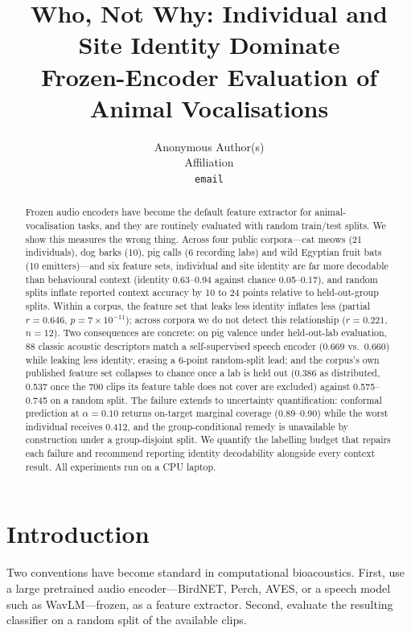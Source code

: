 \documentclass{article}
\title{Who, Not Why: Individual and Site Identity Dominate\\Frozen-Encoder Evaluation of Animal Vocalisations}
\author{%
  Anonymous Author(s)\\
  Affiliation\\
  \texttt{email}
}
\begin{document}
\maketitle

\begin{abstract}
Frozen audio encoders have become the default feature extractor for animal-vocalisation tasks, and
they are routinely evaluated with random train/test splits. We show this measures the wrong thing.
Across four public corpora---cat meows (21 individuals), dog barks (10), pig calls (6 recording labs)
and wild Egyptian fruit bats (10 emitters)---and six feature sets, individual and site identity are
far more decodable than behavioural context (identity 0.63--0.94 against chance 0.05--0.17), and
random splits inflate reported context accuracy by 10 to 24 points relative to held-out-group splits.
Within a corpus, the feature set that leaks less identity inflates less (partial $r{=}0.646$,
$p{=}7\times10^{-11}$); across corpora we do not detect this relationship ($r{=}0.221$, $n{=}12$).
Two consequences are concrete: on pig valence under held-out-lab evaluation, 88 classic acoustic
descriptors match a self-supervised speech encoder (0.669 vs.\ 0.660) while leaking less identity,
erasing a 6-point random-split lead; and the corpus's own published feature set collapses to chance
once a lab is held out (0.386 as distributed, 0.537 once the 700 clips its feature table does not
cover are excluded) against 0.575--0.745 on a random split. The failure extends to uncertainty quantification: conformal
prediction at $\alpha{=}0.10$ returns on-target marginal coverage (0.89--0.90) while the worst
individual receives 0.412, and the group-conditional remedy is unavailable by construction under a
group-disjoint split. We quantify the labelling budget that repairs each failure and recommend
reporting identity decodability alongside every context result. All experiments run on a CPU laptop.
\end{abstract}

\section{Introduction}

Two conventions have become standard in computational bioacoustics. First, use a large pretrained
audio encoder---BirdNET, Perch, AVES, or a speech model such as WavLM---frozen, as a feature
extractor. Second, evaluate the resulting classifier on a random split of the available clips.
\end{document}
